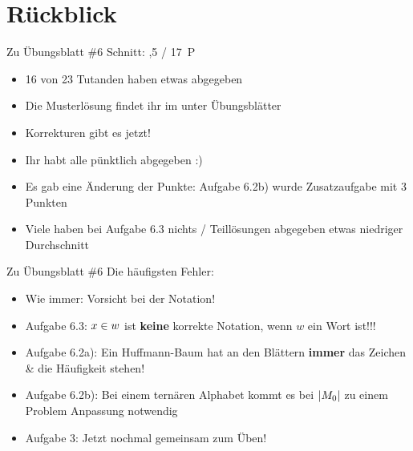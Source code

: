
\newcommand{\handout}{}



\morescalingdelimiters




\section{Rückblick}

\begin{frame}{Zu Übungsblatt \#6}
	Schnitt: ,5 / 17~P

	\begin{itemize}[<+->]
		\item 16 von 23 Tutanden haben etwas abgegeben
		\item Die Musterlösung findet ihr im \ILIAS unter Übungsblätter
		\item Korrekturen gibt es jetzt!
		\item Ihr habt alle pünktlich abgegeben :)
		\item Es gab eine Änderung der Punkte: Aufgabe 6.2b) wurde Zusatzaufgabe mit 3 Punkten
		\item Viele haben bei Aufgabe 6.3 nichts / Teillösungen abgegeben \impl etwas niedriger Durchschnitt
	\end{itemize}
\end{frame}

\begin{frame}{Zu Übungsblatt \#6}
	Die häufigsten Fehler:
	\begin{itemize}[<+->]
		\item Wie immer: Vorsicht bei der Notation!
		\item Aufgabe 6.3: $x \in w$ ist \textbf{keine} korrekte Notation, wenn $w$ ein Wort ist!!!
		\item Aufgabe 6.2a): Ein Huffmann-Baum hat an den Blättern \textbf{immer} das Zeichen \& die Häufigkeit stehen!
		\item Aufgabe 6.2b): Bei einem ternären Alphabet kommt es bei $\left\lvert M_0 \right\rvert$ zu einem Problem
		\implitem Anpassung notwendig
		\item Aufgabe 3: Jetzt nochmal gemeinsam zum Üben!
	\end{itemize}
\end{frame}

